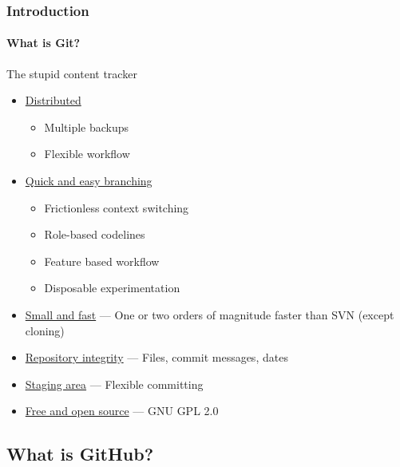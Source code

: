 \begin{frame}
 \frametitle{Introduction}
 \framesubtitle{What is Git?}

 The stupid content tracker\footnotemark
 \begin{itemize}
  \item \href{http://git-scm.com/about/distributed}{Distributed}
   \begin{itemize}
    \item Multiple backups
    \item Flexible workflow
   \end{itemize}
  \item \href{http://git-scm.com/about/branching-and-merging}{Quick and easy
        branching}
   \begin{itemize}
    \item Frictionless context switching
    \item Role-based codelines
    \item Feature based workflow
    \item Disposable experimentation
   \end{itemize}
  \item \href{http://git-scm.com/about/small-and-fast}{Small and fast}
        --- One or two orders of magnitude faster than SVN (except cloning)
  \item \href{http://git-scm.com/about/info-assurance}{Repository integrity}
        --- Files, commit messages, dates
  \item \href{http://git-scm.com/about/staging-area}{Staging area}
        --- Flexible committing
  \item \href{http://git-scm.com/about/free-and-open-source}{Free and open
        source} --- GNU GPL 2.0
 \end{itemize}

\end{frame}

\subsection{What is GitHub?}

